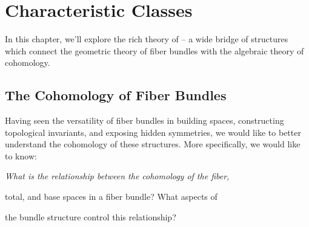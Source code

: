 \chapter{Characteristic Classes}\label{chapter:characteristic_classes}

In this chapter, we'll explore the rich theory of  -- a wide bridge of structures which connect the geometric theory of fiber bundles with the algebraic theory of cohomology.

\section{The Cohomology of Fiber Bundles}


Having seen the versatility of fiber bundles in building spaces, constructing topological invariants, and exposing hidden symmetries, we would like to better understand the cohomology of these structures. More specifically, we would like to know:

\begin{center}
\slshape
What is the relationship between the cohomology of the fiber, 

total, and base spaces in a fiber bundle? What aspects of 

the bundle structure control this relationship?
\end{center}

